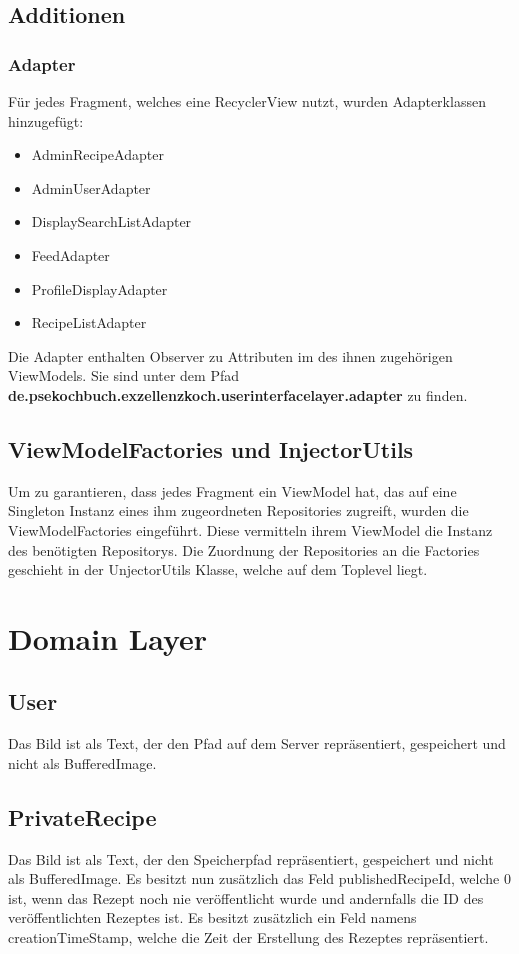 \subsection{Additionen}

\subsubsection{Adapter}
Für jedes Fragment, welches eine RecyclerView nutzt, wurden Adapterklassen hinzugefügt:
\begin{itemize}
	\item AdminRecipeAdapter
	\item AdminUserAdapter
	\item DisplaySearchListAdapter
	\item FeedAdapter
	\item ProfileDisplayAdapter
	\item RecipeListAdapter
\end{itemize}
Die Adapter enthalten Observer zu Attributen im des ihnen zugehörigen ViewModels. Sie sind unter dem Pfad \textbf{de.psekochbuch.exzellenzkoch.userinterfacelayer.adapter} zu finden.

\subsection{ViewModelFactories und InjectorUtils}
Um zu garantieren, dass jedes Fragment ein ViewModel hat, das auf eine Singleton Instanz eines ihm zugeordneten Repositories zugreift, wurden die ViewModelFactories eingeführt. Diese vermitteln ihrem ViewModel die Instanz des benötigten Repositorys. Die Zuordnung der Repositories an die Factories geschieht in der UnjectorUtils Klasse, welche auf dem Toplevel liegt.


\section{Domain Layer}

\subsection{User}
Das Bild ist als Text, der den Pfad auf dem Server repräsentiert, gespeichert und nicht als BufferedImage.

\subsection{PrivateRecipe}
Das Bild ist als Text, der den Speicherpfad repräsentiert, gespeichert und nicht als BufferedImage. Es besitzt nun zusätzlich das Feld publishedRecipeId, welche 0 ist, wenn das Rezept noch nie veröffentlicht wurde und andernfalls die ID des veröffentlichten Rezeptes ist. Es besitzt zusätzlich ein Feld namens creationTimeStamp, welche die Zeit der Erstellung des Rezeptes repräsentiert.

